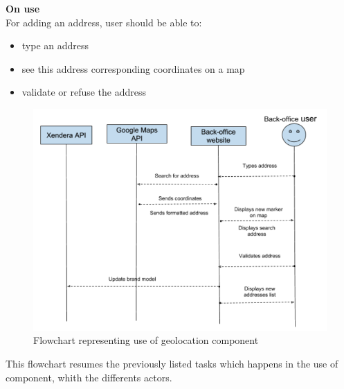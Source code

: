 \documentclass{article}
\begin{document}
                    \textbf{On use}\\
                    For adding an address, user should be able to:
                    \begin{itemize}
                        \item{type an address}
                        \item{see this address corresponding coordinates on a map}
                        \item{validate or refuse the address}
                    \end{itemize}
                    \begin{figure}[H]
                        \includegraphics[width=\textwidth]{use.png}
                        \caption{Flowchart representing use of geolocation component}
                    \end{figure}
                    This flowchart resumes the previously listed tasks which happens in the use of component, whith the differents actors.\\
\end{document}
